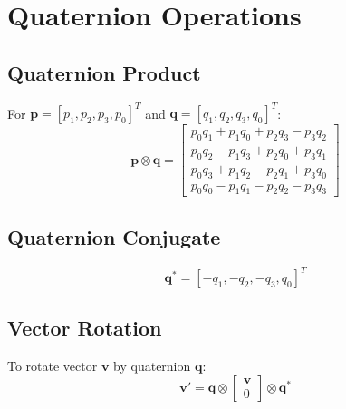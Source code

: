 \documentclass[11pt,a4paper]{article}
\newcommand{\mat}[1]{\mathbf{#1}}
\newcommand{\quat}[1]{\mathbf{#1}}
\begin{document}
\section{Quaternion Operations}

\subsection{Quaternion Product}

For $\quat{p} = [p_1, p_2, p_3, p_0]^T$ and $\quat{q} = [q_1, q_2, q_3, q_0]^T$:
\begin{equation}
    \quat{p} \otimes \quat{q} = \begin{bmatrix}
        p_0 q_1 + p_1 q_0 + p_2 q_3 - p_3 q_2 \\
        p_0 q_2 - p_1 q_3 + p_2 q_0 + p_3 q_1 \\
        p_0 q_3 + p_1 q_2 - p_2 q_1 + p_3 q_0 \\
        p_0 q_0 - p_1 q_1 - p_2 q_2 - p_3 q_3
    \end{bmatrix}
\end{equation}

\subsection{Quaternion Conjugate}

\begin{equation}
    \quat{q}^* = [-q_1, -q_2, -q_3, q_0]^T
\end{equation}

\subsection{Vector Rotation}

To rotate vector $\mat{v}$ by quaternion $\quat{q}$:
\begin{equation}
    \mat{v}' = \quat{q} \otimes \begin{bmatrix} \mat{v} \\ 0 \end{bmatrix} \otimes \quat{q}^*
\end{equation}
\end{document}
